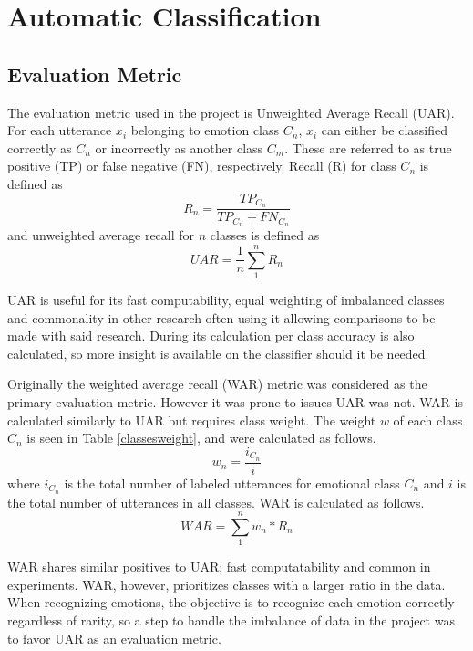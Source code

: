\section{Automatic Classification}
\subsection{Evaluation Metric}
	The evaluation metric used in the project is Unweighted Average Recall (UAR). For each utterance $x_i$ belonging to emotion class $C_n$, $x_i$ can either be classified correctly as $C_n$ or incorrectly as another class $C_m$. These are referred to as true positive (TP) or false negative (FN), respectively. Recall (R) for class $C_n$ is defined as
	\begin{equation}
	R_n = \frac{TP_{C_n}}{TP_{C_n} + FN_{C_n}}
	\end{equation}
	and unweighted average recall for $n$ classes is defined as
	\begin{equation}
	UAR =  \frac{1}{n} \sum_{1}^{n} R_n
	\end{equation}
	
	UAR is useful for its fast computability, equal weighting of imbalanced classes and commonality in other research often using it allowing comparisons to be made with said research. During its calculation per class accuracy is also calculated, so more insight is available on the classifier should it be needed.
	
	Originally the weighted average recall (WAR) metric was considered as the primary evaluation metric. However it was prone to issues UAR was not. WAR is calculated similarly to UAR but requires class weight. The weight $w$ of each class $C_n$ is seen in Table \ref{classesweight}, and were calculated as follows.
		\begin{equation}
		w_n = \frac{i_{C_n}}{i}
		\end{equation}
	where $i_{C_n}$ is the total number of labeled utterances for emotional class $C_n$ and $i$ is the total number of utterances in all classes. WAR is calculated as follows.
	\begin{equation}
	WAR = \sum_{1}^{n} w_n * R_n
	\end{equation}
	
	WAR shares similar positives to UAR;  fast computatability and common in experiments. WAR, however, prioritizes classes with a larger ratio in the data. When recognizing emotions, the objective is to recognize each emotion correctly regardless of rarity, so a step to handle the imbalance of data in the project was to favor UAR as an evaluation metric.
